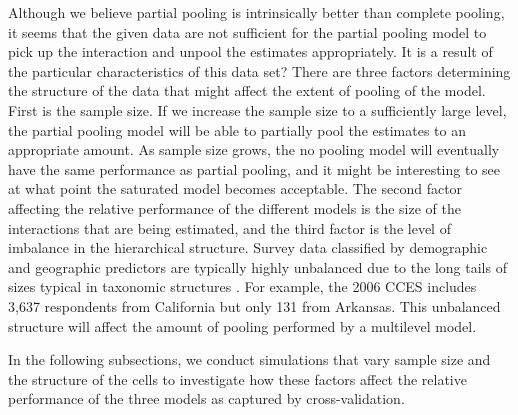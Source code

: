 \documentclass[sii]{ipart}
\begin{document}
Although we believe partial pooling is intrinsically better than complete
pooling, it seems that the given data are not sufficient for the partial pooling
model to pick up the interaction and unpool the estimates appropriately. It is a
result of the particular characteristics of this data set?  There are three
factors determining the structure of the data that might affect the extent of
pooling of the model. First is the sample size. If we increase the sample size to
a sufficiently large level, the partial pooling model will be able to partially
pool the estimates to an appropriate amount. As sample size grows, the no pooling
model will eventually have the same performance as partial pooling, and it might
be interesting to see at what point the saturated model becomes acceptable. The
second factor affecting the relative performance of the different models is the
size of the interactions that are being estimated, and the third factor is the
level of imbalance in the hierarchical structure. Survey data classified by
demographic and geographic predictors are typically highly unbalanced due to the
long tails of sizes typical in taxonomic structures \citep{Mandelbrot:1955}. For
example, the 2006 CCES includes 3,637 respondents from California but only 131
from Arkansas. This unbalanced structure will affect the amount of pooling
performed by a multilevel model.

In the following subsections, we conduct simulations that vary sample size and
the structure of the cells to investigate how these factors affect the relative
performance of the three models as captured by cross-validation.
\end{document}

